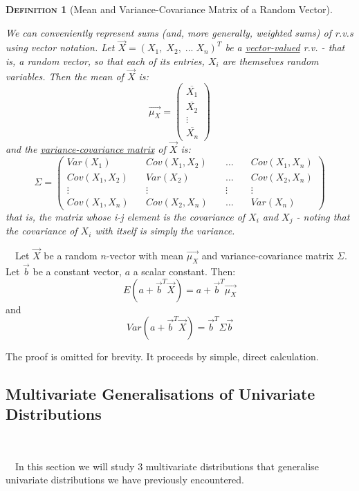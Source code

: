 \documentclass[12pt,a4paper]{article}
\newtheorem{definition}{\textsc{Definition}}[section]
\begin{document}
\begin{definition}[Mean and Variance-Covariance Matrix of a Random Vector]$\;$\par\vspace{1cm}

We can conveniently represent sums (and, more generally, weighted sums) of r.v.s using vector notation. 
Let $\vec{X} = (X_1,\; X_2,\; ...\; X_n)^T$ be a \underline{vector-valued} r.v. - that is, a random vector, so that each of its entries, $X_i$ are themselves random variables. Then the mean of $\vec{X}$ is:
$$\vec{\mu_X} = \left(\begin{array}{c}\overline{X_1}\\ \overline{X_2}\\ \vdots\\ \overline{X_n} \end{array}\right)$$
and the \underline{variance-covariance matrix} of $\vec{X}$ is:
$$\Sigma = \left( \begin{array}{cccc} Var(X_1)\quad& Cov(X_1,X_2)\quad& \hdots\quad& Cov(X_1,X_n)\\Cov(X_1,X_2)\quad& Var(X_2)\quad& \hdots\quad& Cov(X_2,X_n)\\ \vdots\quad& \vdots & \vdots\quad & \vdots\\ Cov(X_1,X_n) & Cov(X_2,X_n)\quad& \hdots& Var(X_n) \end{array}\right)$$
that is, the matrix whose i-j element is the covariance of $X_i$ and $X_j$ - noting that the covariance of $X_i$ with itself is simply the variance.

\end{definition}


$\quad$Let $\vec{X}$ be a random $n$-vector with mean $\vec{\mu_X}$ and variance-covariance matrix $\Sigma$. Let $\vec{b}$ be a constant vector, $a$ a scalar constant. Then:
$$E(a+\vec{b}^T\vec{X}) = a + \vec{b}^T\vec{\mu_X}$$
and
$$Var(a + \vec{b}^T\vec{X}) = \vec{b}^T\Sigma\vec{b}$$

The proof is omitted for brevity. It proceeds by simple, direct calculation.


\subsection{Multivariate Generalisations of Univariate Distributions}$\;$

$\quad$In this section we will study 3 multivariate distributions that generalise univariate distributions we have previously encountered.
\end{document}
